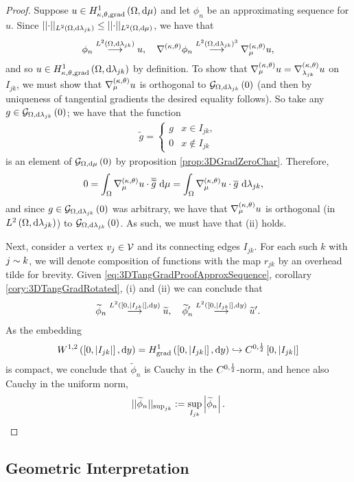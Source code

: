 \begin{proof}
	Suppose $u\in H^1_{\kappa,\theta,\mathrm{grad}}\left( \Omega, \mathrm{d}\mu \right)$ and let $\phi_n$ be an approximating sequence for $u$.
	Since $\lvert\lvert \cdot \rvert\rvert_{L^{2}\left( \Omega,\mathrm{d}\lambda_{jk} \right)} \leq \lvert\lvert \cdot \rvert\rvert_{L^{2}\left( \Omega,\mathrm{d}\mu \right)}$, we have that 
	\begin{align} \label{eq:3DTangGradProofApproxSequence}
		\phi_n\overset{L^{2}\left( \Omega,\mathrm{d}\lambda_{jk} \right)}{\longrightarrow} u, 
		\quad
		\nabla^{\left( \kappa, \theta \right)}\phi_n\overset{L^{2}\left( \Omega,\mathrm{d}\lambda_{jk} \right)^3}{\longrightarrow}\nabla^{\left( \kappa, \theta \right)}_{\mu}u,
	\end{align}
	and so $u\in H^1_{\kappa,\theta,\mathrm{grad}}\left( \Omega, \mathrm{d}\lambda_{jk} \right)$ by definition.
	To show that $\nabla^{\left( \kappa, \theta \right)}_{\mu}u = \nabla^{\left( \kappa, \theta \right)}_{\lambda_{jk}}u$ on $I_{jk}$, we must show that $\nabla^{\left( \kappa, \theta \right)}_{\mu}u$ is orthogonal to $\mathcal{G}_{ \Omega, \mathrm{d}\lambda_{jk}}\left( 0 \right)$ (and then by uniqueness of tangential gradients the desired equality follows).
	So take any $g\in\mathcal{G}_{ \Omega, \mathrm{d}\lambda_{jk}}\left( 0 \right)$; we have that the function
	\begin{align*}
		\widetilde{g} = \begin{cases} g & x\in I_{jk}, \\ 0 & x\not\in I_{jk} \end{cases}
	\end{align*}
	is an element of $\mathcal{G}_{ \Omega, \mathrm{d}\mu}\left( 0 \right)$ by proposition \ref{prop:3DGradZeroChar}.
	Therefore, 
	\begin{align*}
		0 &= \int_{\Omega} \nabla^{\left( \kappa, \theta \right)}_{\mu}u\cdot\overline{\widetilde{g}}  \ \mathrm{d}\mu
		= \int_{\Omega} \nabla^{\left( \kappa, \theta \right)}_{\mu}u\cdot\overline{g}  \ \mathrm{d}\lambda_{jk},
	\end{align*}
	and since $g\in\mathcal{G}_{ \Omega, \mathrm{d}\lambda_{jk}}\left( 0 \right)$ was arbitrary, we have that $\nabla^{\left( \kappa, \theta \right)}_{\mu}u$ is orthogonal (in $L^{2}\left( \Omega,\mathrm{d}\lambda_{jk} \right)$) to $\mathcal{G}_{ \Omega, \mathrm{d}\lambda_{jk}}\left( 0 \right)$.
	As such, we must have that (ii) holds.
	
	Next, consider a vertex $v_j\in\mathcal{V}$ and its connecting edges $I_{jk}$.
	For each such $k$ with $j\sim k$, we will denote composition of functions with the map $r_{jk}$ by an overhead tilde for brevity.
	Given \eqref{eq:3DTangGradProofApproxSequence}, corollary \ref{cory:3DTangGradRotated}, (i) and (ii) we can conclude that
	\begin{align*}
		\widetilde{\phi}_n \overset{L^{2}\left( \left[ 0,\left\lvert I_{jk} \right\rvert \right],\mathrm{d}y \right)}{\longrightarrow} \widetilde{u},
		\quad
		\widetilde{\phi}_n' \overset{L^{2}\left( \left[ 0,\left\lvert I_{jk} \right\rvert \right],\mathrm{d}y \right)}{\longrightarrow} \widetilde{u}'.
	\end{align*}
	As the embedding
	\begin{align*}
		W^{1,2}\left( \left[ 0,\left\lvert I_{jk} \right\rvert \right],\mathrm{d} y \right) = H^1_\mathrm{grad}\left( \left[ 0,\left\lvert I_{jk} \right\rvert \right], \mathrm{d}y \right) \hookrightarrow C^{0,\frac{1}{2}}\left[ 0,\left\lvert I_{jk} \right\rvert \right]
	\end{align*}
	is compact, we conclude that $\widetilde{\phi}_n$ is Cauchy in the $C^{0,\frac{1}{2}}$-norm, and hence also Cauchy in the uniform norm,
	\begin{align*}
		\lvert\lvert \widetilde{\phi}_n \rvert\rvert_{\sup_{jk}} := \sup_{I_{jk}}\left\lvert \widetilde{\phi}_n \right\rvert.
	\end{align*}
\end{proof}

\subsection{Geometric Interpretation} \label{ssec:3DGradGeometric}